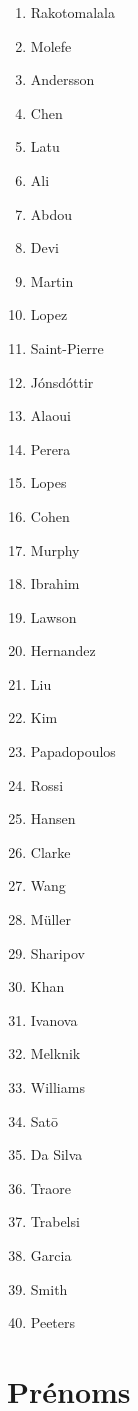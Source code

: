 \documentclass[a5paper,pagesize,10pt,bibliography=totoc,numbers=enddot,
headings=normal,DIV=9,twoside=false,tablecaptionabove]{scrbook}
\begin{document}
\begin{multicols}{3}
\begin{enumerate}
	\item Rakotomalala
	\item Molefe
	\item Andersson
	\item Chen
	\item Latu
	\item Ali
	\item Abdou
	\item Devi
	\item Martin
	\item Lopez
	\item Saint-Pierre
	\item Jónsdóttir
	\item Alaoui
	\item Perera
	\item Lopes
	\item Cohen
	\item Murphy
	\item Ibrahim
	\item Lawson
	\item Hernandez
	\item Liu
	\item Kim
	\item Papadopoulos
	\item Rossi
	\item Hansen
	\item Clarke
	\item Wang
	\item Müller
	\item Sharipov
	\item Khan
	\item Ivanova
	\item Melknik
	\item Williams
	\item Satō
	\item Da Silva
	\item Traore
	\item Trabelsi
	\item Garcia
	\item Smith
	\item Peeters
\end{enumerate}
\end{multicols}
\section{Prénoms}
\end{document}
